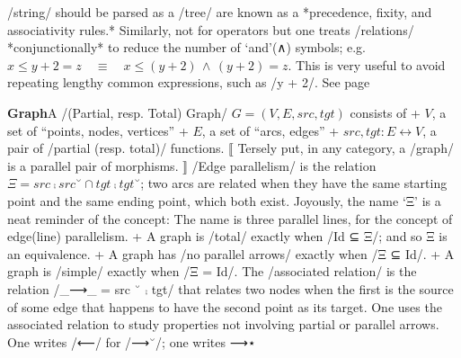 \documentclass[11pt]{article}
\begin{document}
/string/ should be parsed as a /tree/ are known as a *precedence, fixity, and associativity rules.*  Similarly, not for operators but one treats /relations/ *conjunctionally* to reduce the number of ‘and’(∧) symbols; e.g. $x ≤ y + 2 = z \quad≡\quad x ≤ (y + 2) \,∧\, (y + 2) = z$. This is very useful to avoid repeating lengthy common expressions, such as /y + 2/. See page \pageref{org-special-block-extras-glossary-declaration-site-Expression}

\vspace{1em}\textbf{Graph}\quad\label{org-special-block-extras-glossary-graph}A /(Partial, resp. Total) Graph/ $G = (V, E, src, tgt)$ consists of  \quad  + $V$, a set of “points, nodes, vertices”  \quad  + $E$, a set of “arcs, edges”  \quad  + $src, tgt : E ↔ V$, a pair of /partial (resp. total)/ functions.  ⟦ Tersely put, in any category, a /graph/ is a parallel pair of morphisms. ⟧  /Edge parallelism/ is the relation $Ξ = src ⨾ src ˘ ∩ tgt ⨾ tgt˘$; two arcs are related when they have the same starting point and the same ending point, which both exist. Joyously, the name ‘Ξ’ is a neat reminder of the concept: The name is three parallel lines, for the concept of edge(line) parallelism.  + A graph is /total/ exactly when /Id ⊆ Ξ/; and so Ξ is an equivalence. + A graph has /no parallel arrows/ exactly when /Ξ ⊆ Id/. + A graph is /simple/ exactly when /Ξ = Id/.  The /associated relation/ is the relation /_⟶_ = src ˘ ⨾ tgt/ that relates two nodes when the first is the source of some edge that happens to have the second point as its target. One uses the associated relation to study properties not involving partial or parallel arrows. One writes /⟵/ for /⟶˘/; one writes ⟶⋆ 
\end{document}
